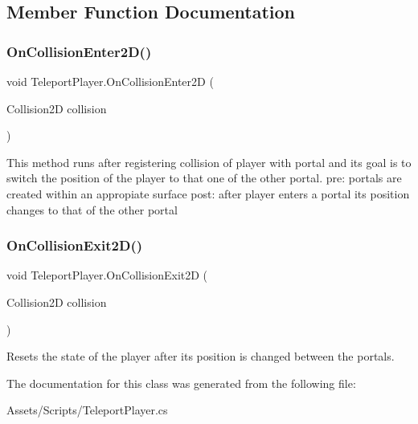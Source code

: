 \subsection{Member Function Documentation}
\mbox{\label{class_teleport_player_a1ab94b6c3d13f1287f9127393afe2298}} 
\subsubsection{\texorpdfstring{On\+Collision\+Enter2\+D()}{OnCollisionEnter2D()}}
{\footnotesize\ttfamily void Teleport\+Player.\+On\+Collision\+Enter2D (\begin{DoxyParamCaption}\item[{Collision2D}]{collision }\end{DoxyParamCaption})\hspace{0.3cm}{\ttfamily [inline]}}

This method runs after registering collision of player with portal and its goal is to switch the position of the player to that one of the other portal. pre\+: portals are created within an appropiate surface post\+: after player enters a portal it\textquotesingle{}s position changes to that of the other portal \mbox{\label{class_teleport_player_ac85fc2322d2dc27de518434422c2c25e}} 
\subsubsection{\texorpdfstring{On\+Collision\+Exit2\+D()}{OnCollisionExit2D()}}
{\footnotesize\ttfamily void Teleport\+Player.\+On\+Collision\+Exit2D (\begin{DoxyParamCaption}\item[{Collision2D}]{collision }\end{DoxyParamCaption})\hspace{0.3cm}{\ttfamily [inline]}}

Resets the state of the player after its position is changed between the portals. 

The documentation for this class was generated from the following file\+:\begin{DoxyCompactItemize}
\item 
Assets/\+Scripts/Teleport\+Player.\+cs\end{DoxyCompactItemize}
